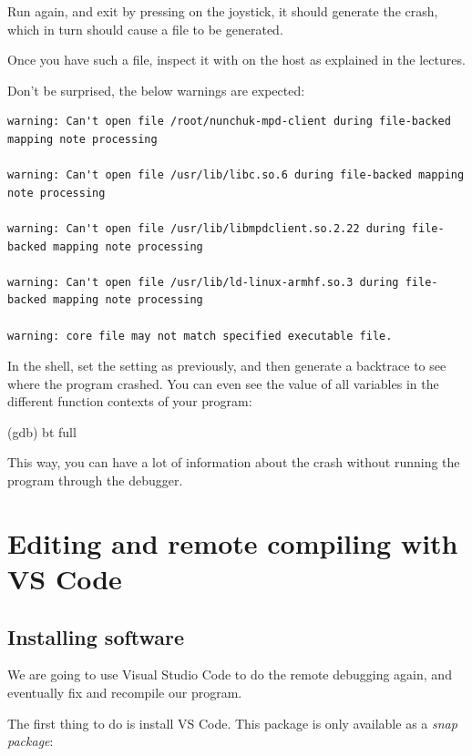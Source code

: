 Run  again, and exit by pressing  on
the joystick, it should generate the crash, which in turn should cause
a  file to be generated.

Once you have such a file, inspect it with 
on the host as explained in the lectures.

Don't be surprised, the below warnings are expected:

{\small
\begin{verbatim}
warning: Can't open file /root/nunchuk-mpd-client during file-backed mapping note processing

warning: Can't open file /usr/lib/libc.so.6 during file-backed mapping note processing

warning: Can't open file /usr/lib/libmpdclient.so.2.22 during file-backed mapping note processing

warning: Can't open file /usr/lib/ld-linux-armhf.so.3 during file-backed mapping note processing

warning: core file may not match specified executable file.
\end{verbatim}
}

In the  shell, set the  setting as previously, and then
generate a backtrace to see where the program crashed.
You can even see the value of all variables in the different
function contexts of your program:

\begin{bashinput}
(gdb) bt full
\end{bashinput}

This way, you can have a lot of information about the crash
without running the program through the debugger.

\section{Editing and remote compiling with VS Code}

\subsection{Installing software}

We are going to use Visual Studio Code to do the remote debugging
again, and eventually fix and recompile our program.

The first thing to do is install VS Code. This package is only available
as a {\em snap package}:

